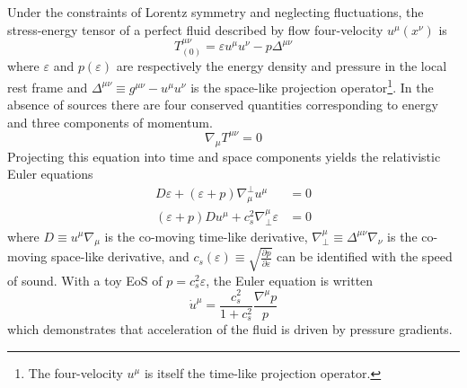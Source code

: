 Under the constraints of Lorentz symmetry and neglecting fluctuations, the stress-energy tensor of a perfect fluid described by flow four-velocity $u^\mu(x^\nu)$ is
\begin{equation}
T^{\mu\nu}_{(0)} = \varepsilon u^\mu u^\nu - p \Delta^{\mu\nu}
\end{equation}
where $\varepsilon$ and $p(\varepsilon)$ are respectively the energy density and pressure in the local rest frame and \( \Delta^{\mu\nu} \equiv g^{\mu\nu} - u^\mu u^\nu \) is the space-like projection operator\footnote{The four-velocity $u^\mu$ is itself the time-like projection operator.}.
In the absence of sources there are four conserved quantities corresponding to energy and three components of momentum.
\begin{equation}
  \label{eq:em_cons}
  \nabla_\mu T^{\mu\nu} = 0
\end{equation}
Projecting this equation into time and space components yields the relativistic Euler equations
\begin{align}
  D\varepsilon + \left(\varepsilon + p\right)\nabla^\perp_\mu u^\mu &= 0 \\
  \left(\varepsilon + p\right)Du^\mu + c_s^2 \nabla_\perp^\mu \varepsilon &= 0 
\end{align}
where \(D \equiv u^\mu \nabla_\mu\) is the co-moving time-like derivative, \( \nabla_\perp^\mu \equiv \Delta^{\mu\nu} \nabla_\nu \) is the co-moving space-like derivative, and \(c_s(\varepsilon) \equiv \sqrt{\frac{\partial p}{\partial \varepsilon}} \) can be identified with the speed of sound.
With a toy \ac{EoS} of $p = c_s^2 \varepsilon$, the Euler equation is written
\begin{equation}
\dot{u}^\mu = \frac{c_s^2}{1+c_s^2} \frac{\nabla^\mu p}{p}
\end{equation}
which demonstrates that acceleration of the fluid is driven by pressure gradients.

